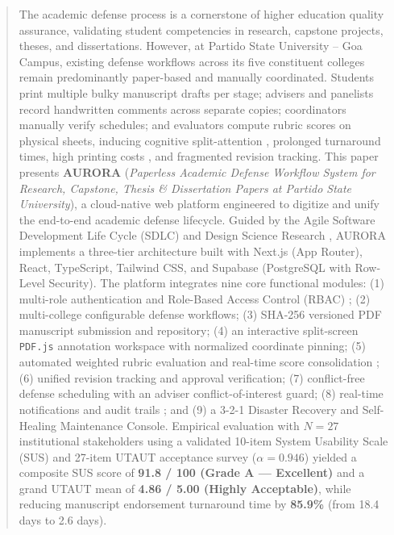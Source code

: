 \documentclass[sigplan,screen,nonacm]{acmart}
\begin{document}
\begin{abstract}
The academic defense process is a cornerstone of higher education quality assurance, validating student competencies in research, capstone projects, theses, and dissertations. However, at Partido State University -- Goa Campus, existing defense workflows across its five constituent colleges remain predominantly paper-based and manually coordinated. Students print multiple bulky manuscript drafts per stage; advisers and panelists record handwritten comments across separate copies; coordinators manually verify schedules; and evaluators compute rubric scores on physical sheets, inducing cognitive split-attention \cite{sweller1988cognitive}, prolonged turnaround times, high printing costs \cite{isaeva2016paperless, tatli2024sustainable}, and fragmented revision tracking. This paper presents \textbf{AURORA} (\textit{Paperless Academic Defense Workflow System for Research, Capstone, Thesis \& Dissertation Papers at Partido State University}), a cloud-native web platform engineered to digitize and unify the end-to-end academic defense lifecycle. Guided by the Agile Software Development Life Cycle (SDLC) and Design Science Research \cite{hevner2004design}, AURORA implements a three-tier architecture built with Next.js (App Router), React, TypeScript, Tailwind CSS, and Supabase (PostgreSQL with Row-Level Security). The platform integrates nine core functional modules: (1) multi-role authentication and Role-Based Access Control (RBAC) \cite{ferraiolo1992role}; (2) multi-college configurable defense workflows; (3) SHA-256 versioned PDF manuscript submission and repository; (4) an interactive split-screen \texttt{PDF.js} annotation workspace with normalized coordinate pinning; (5) automated weighted rubric evaluation and real-time score consolidation \cite{spady1994outcome, erradi2012automated}; (6) unified revision tracking and approval verification; (7) conflict-free defense scheduling with an adviser conflict-of-interest guard; (8) real-time notifications and audit trails \cite{iso27001}; and (9) a 3-2-1 Disaster Recovery and Self-Healing Maintenance Console. Empirical evaluation with $N = 27$ institutional stakeholders using a validated 10-item System Usability Scale (SUS) \cite{brooke1996sus} and 27-item UTAUT acceptance survey \cite{venkatesh2003user} ($\alpha = 0.946$) yielded a composite SUS score of \textbf{91.8 / 100 (Grade A --- Excellent)} \cite{bangor2009determining} and a grand UTAUT mean of \textbf{4.86 / 5.00 (Highly Acceptable)}, while reducing manuscript endorsement turnaround time by \textbf{85.9\%} (from 18.4 days to 2.6 days).
\end{abstract}
\end{document}

